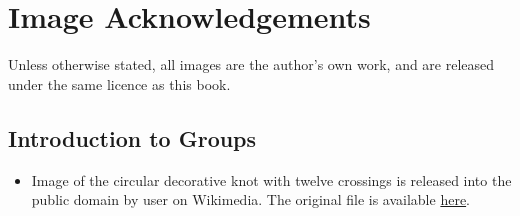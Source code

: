\chapter{Image Acknowledgements}
Unless otherwise stated, all images are the author's own work, and are released under the same licence as this book.

\section*{Introduction to Groups}
\begin{itemize}
    \item Image of the circular decorative knot with twelve crossings is released into the public domain by user  on Wikimedia. The original file is available \href{https://commons.wikimedia.org/wiki/File:Circular-cross-decorative-knot-12crossings.svg}{here}.
\end{itemize}
